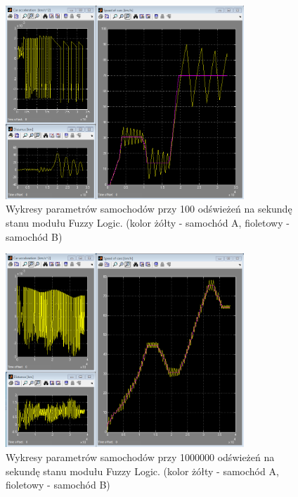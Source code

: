 \documentclass[11pt,a4paper]{article}
\begin{document}
\begin{figure}
\centering
\includegraphics[width=0.8\textwidth]{10to2.png}
\caption{Wykresy parametrów samochodów przy 100 odświeżeń na sekundę stanu modułu Fuzzy Logic. (kolor żółty - samochód A, fioletowy - samochód B)} 
\label{img:tenToTwo}
\end{figure}

\begin{figure}
\centering
\includegraphics[width=0.8\textwidth]{10to6.png}
\caption{Wykresy parametrów samochodów przy 1000000 odświeżeń na sekundę stanu modułu Fuzzy Logic. (kolor żółty - samochód A, fioletowy - samochód B)} 
\label{img:tenToSix}
\end{figure}
\end{document}
